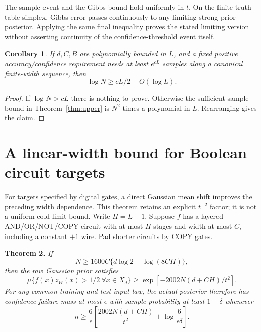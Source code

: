 \documentclass[11pt]{article}
\newtheorem{theorem}{Theorem}[section]
\newtheorem{corollary}[theorem]{Corollary}
\theoremstyle{remark}\newtheorem{remark}[theorem]{Remark}
\begin{document}
The sample event and the Gibbs bound hold uniformly in $t$. On the
finite truth-table simplex, Gibbs error passes continuously to any
limiting strong-prior posterior. Applying the same final inequality
proves the stated limiting version without asserting continuity of
the confidence-threshold event itself.

\begin{corollary}\label{cor:exponential-width}
If $d,C,B$ are polynomially bounded in $L$, and a fixed positive
accuracy/confidence requirement needs at least $e^{cL}$ samples along
a canonical finite-width sequence, then
\[
 \log N\ge cL/2-O(\log L).
\]
\end{corollary}
\begin{proof}
If $\log N>cL$ there is nothing to prove. Otherwise the sufficient
sample bound in Theorem~\ref{thm:upper} is $N^2$ times a polynomial
in $L$. Rearranging gives the claim.
\end{proof}

\section{A linear-width bound for Boolean circuit targets}
\label{sec:boolean-mean-shift}

For targets specified by digital gates, a direct Gaussian mean shift
improves the preceding width dependence. This theorem retains an
explicit $t^{-2}$ factor; it is not a uniform cold-limit bound.
Write $H=L-1$. Suppose $f$ has a layered AND/OR/NOT/COPY circuit
with at most $H$ stages and width at most $C$, including a constant
$+1$ wire. Pad shorter circuits by COPY gates.

\begin{theorem}\label{thm:boolean-linear-width}
If
\[
 N\ge1600C\{d\log2+\log(8CH)\},
\]
then the raw Gaussian prior satisfies
\[
 \mu\{f(x)z_W(x)>1/2\ \forall x\in X_d\}
 \ge \exp[-2002N(d+CH)/t^2].
\]
For any common training and test input law, the actual posterior
therefore has confidence-failure mass at most $\epsilon$ with
sample probability at least $1-\delta$ whenever
\[
 n\ge\frac6\epsilon\left[
       \frac{2002N(d+CH)}{t^2}
       +\log\frac6{\epsilon\delta}\right].
\]
\end{theorem}
\end{document}

